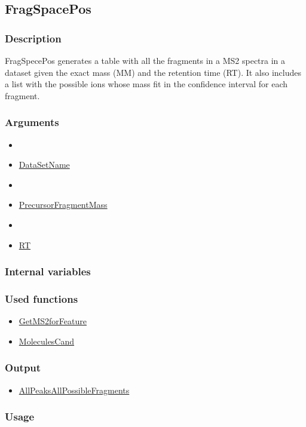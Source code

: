 \subsection{FragSpacePos}\label{FragSpacePos}
\subsubsection{Description}
FragSpecePos generates a table with all the fragments in a MS2 spectra in a dataset given the exact mass (MM) and the retention time (RT). It also includes a list with the possible ions whose mass fit in the confidence interval for each fragment.
\subsubsection{Arguments}
\begin{itemize}
\item \item \hyperref[DataSetName]{DataSetName}
\item \item \hyperref[PrecursorFragmentMass]{PrecursorFragmentMass}
\item \item \hyperref[RT]{RT}
\end{itemize}
\subsubsection{Internal variables}
\subsubsection{Used functions}
\begin{itemize}
\item \hyperref[GetMS2forFeature]{GetMS2forFeature}
\item \hyperref[MoleculesCand]{MoleculesCand}
\end{itemize}
\subsubsection{Output}
\begin{itemize}
\item \hyperref[AllPeaksAllPossibleFragments]{AllPeaksAllPossibleFragments}
\end{itemize}
\subsubsection{Usage}
